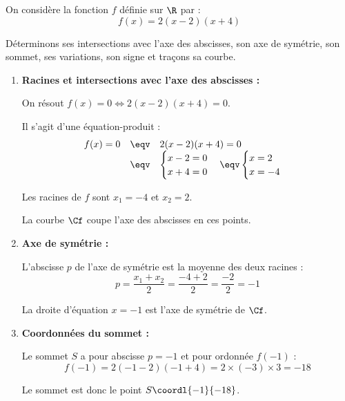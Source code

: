 \begin{methode}
	On considère la fonction $f$ définie sur $\R$ par :
	\[
		f(x) = 2(x-2)(x+4)
	\]

	Déterminons ses intersections avec l'axe des abscisses, son axe de symétrie, son sommet, ses variations, son signe et traçons sa courbe.

	\newpage

	\begin{correction}
		\nline
		\begin{enumerate}
			\item \textbf{Racines et intersections avec l'axe des abscisses :}

			      On résout $f(x) = 0 \iff 2(x-2)(x+4) = 0$.

			      Il s'agit d'une équation-produit :
			      \[
				      \begin{array}{rcl}
					      f(x) = 0 & \eqv & 2(x-2)(x+4) = 0                                                                      \\
					               & \eqv & \begin{cases}x-2 = 0\\ x+4 = 0\end{cases} \eqv \begin{cases}x = 2\\x = -4\end{cases}
				      \end{array}
			      \]

			      Les racines de $f$ sont $x_1 = -4$ et $x_2 = 2$.

			      La courbe $\Cf$ coupe l'axe des abscisses en ces points.

			\item \textbf{Axe de symétrie :}

			      L'abscisse $p$ de l'axe de symétrie est la moyenne des deux racines :
			      \[
				      p = \dfrac{x_1 + x_2}{2} = \dfrac{-4 + 2}{2} = \dfrac{-2}{2} = -1
			      \]

			      La droite d'équation $x = -1$ est l'axe de symétrie de $\Cf$.

			\item \textbf{Coordonnées du sommet :}

			      Le sommet $S$ a pour abscisse $p = -1$ et pour ordonnée $f(-1)$ :
			      \[
				      f(-1) = 2(-1-2)(-1+4) = 2 \times (-3) \times 3 = -18
			      \]

				  Le sommet est donc le point $S\coordl{-1}{-18}$.


\end{enumerate}
\end{correction}
\end{methode}
